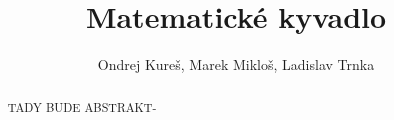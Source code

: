 \documentclass[reqno, a4paper]{amsart}
\title[Matematické kyvadlo]{Matematické kyvadlo}
\author{Ondrej Kureš, Marek Mikloš, Ladislav Trnka}
\numberwithin{equation}{section}
\begin{document}
\begin{abstract}
TADY BUDE ABSTRAKT-
\end{abstract}

\maketitle

\tableofcontents




%
%
%

\end{document}
